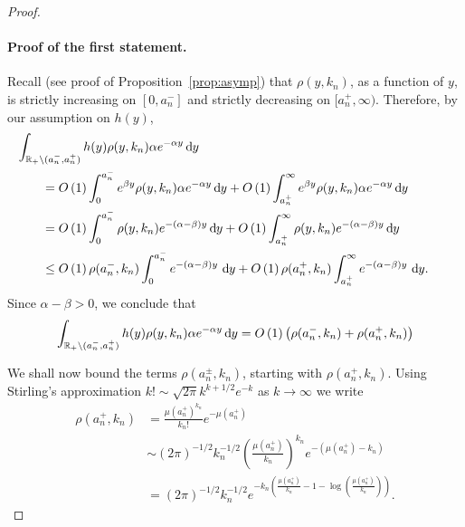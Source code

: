 \begin{proof}\hfill

\paragraph{Proof of the first statement.}
Recall (see proof of Proposition~\ref{prop:asymp}) that $\rho(y,k_n)$, as a function of $y$, is strictly increasing on $[0,a_n^-]$ and strictly decreasing on $[a_n^+,\infty)$. Therefore, by our assumption on $h(y)$,
\begin{align*}
	&\hspace{-20pt}\int_{\R_+ \setminus (a_n^-, a_n^+)} h(y) \rho(y,k_n) 
		\alpha e^{-\alpha y} \dd y\\
    &= \bigO{1} \int_0^{a_n^-} e^{\beta y} \rho(y,k_n) \alpha e^{-\alpha y} \dd y 
    	+ \bigO{1}\int_{a_n^+}^{\infty} e^{\beta y} \rho(y,k_n) \alpha e^{-\alpha y} \dd y \\
    &= \bigO{1} \int_0^{a_n^-} \rho(y,k_n) e^{-(\alpha-\beta) y} \dd y 
   		+ \bigO{1} \int_{a_n^+}^{\infty} \rho(y,k_n) e^{-(\alpha-\beta) y} \dd y\\
   	&\le \bigO{1}\rho(a_n^-,k_n)\int_0^{a_n^-} e^{-(\alpha-\beta) y} \, \dd y
   		+ \bigO{1} \rho(a_n^+,k_n) \int_{a_n^+}^{\infty} e^{-(\alpha-\beta) y} \, \dd y.
\end{align*}
Since $\alpha - \beta > 0$, we conclude that
\begin{equation}\label{eq:concentration_lemma_integral_bound}
	\int_{{\mathbb R}_+ \setminus (a_n^-, a_n^+)} h(y) \rho(y,k_n) \alpha e^{-\alpha y} \operatorname{\mathrm{d}\hspace{-2pt}} y
	= O\left(1\right) \left(\rho(a_n^-,k_n) + \rho(a_n^+,k_n)\right) 
\end{equation}

We shall now bound the terms $\rho(a_n^\pm,k_n)$, starting with $\rho(a_n^+,k_n)$.  Using Stirling's approximation $k! \sim \sqrt{2\pi} k^{k + 1/2} e^{-k}$ as $k \to \infty$ we write
\begin{align*}
	\rho(a_n^+,k_n) &= \frac{\mu(a_n^+)^{k_n}}{k_n!} e^{-\mu(a_n^+)} \\
	&\sim (2\pi)^{-1/2} k_n^{-1/2} \left(\frac{\mu(a_n^+)}{k_n}\right)^{k_n} e^{-(\mu(a_n^+) - k_n)}\\
	&= (2\pi)^{-1/2} k_n^{-1/2} 
		e^{-k_n\left(\frac{\mu(a_n^+)}{k_n} - 1 - \log\left(\frac{\mu(a_n^+)}{k_n}\right)\right)}.
\end{align*}


\end{proof}
